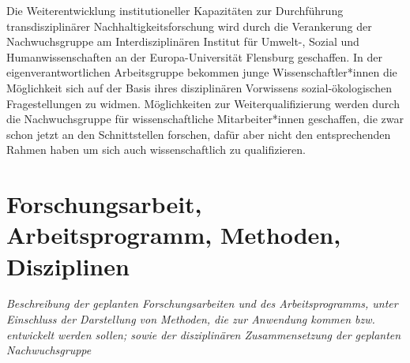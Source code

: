 \documentclass[a4paper,11pt,twoside]{scrartcl}
\begin{document}
Die Weiterentwicklung institutioneller Kapazitäten zur Durchführung transdisziplinärer Nachhaltigkeitsforschung wird durch die Verankerung der Nachwuchsgruppe am Interdisziplinären Institut für Umwelt-, Sozial und Humanwissenschaften an der Europa-Universität Flensburg geschaffen. In der eigenverantwortlichen Arbeitsgruppe bekommen junge Wissenschaftler*innen die Möglichkeit sich auf der Basis ihres disziplinären Vorwissens sozial-ökologischen Fragestellungen zu widmen. Möglichkeiten zur Weiterqualifizierung werden durch die  Nachwuchsgruppe für wissenschaftliche Mitarbeiter*innen geschaffen, die zwar schon jetzt an den Schnittstellen forschen, dafür aber nicht den entsprechenden Rahmen haben um sich auch wissenschaftlich zu qualifizieren.


\section{Forschungsarbeit, Arbeitsprogramm, Methoden, Disziplinen}
\textit{Beschreibung der geplanten Forschungsarbeiten und des Arbeitsprogramms, unter Einschluss der Darstellung von Methoden, die zur Anwendung kommen bzw. entwickelt werden sollen; sowie der disziplinären Zusammensetzung der geplanten Nachwuchsgruppe}

\end{document}
